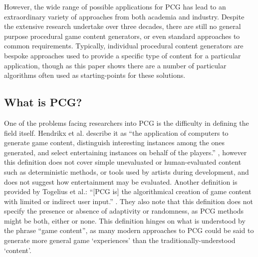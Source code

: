 \documentclass{acm_proc_article-sp}
\begin{document}
However, the wide range of possible applications for PCG has lead to an extraordinary variety of approaches from both academia and industry. Despite the extensive research undertake over three decades, there are still no general purpose procedural game content generators, or even standard approaches to common requirements. Typically, individual procedural content generators are bespoke approaches used to provide a specific type of content for a particular application, though as this paper shows there are a number of particular algorithms often used as starting-points for these solutions.

\subsection{What is PCG?}
One of the problems facing researchers into PCG is the difficulty in defining the field itself.
Hendrikx et al. describe it as ``the application of computers to generate game content, distinguish interesting instances among the ones generated, and select entertaining instances on behalf of the players.'' \cite{hendrikx2012procedural}, however this definition does not cover simple unevaluated or human-evaluated content such as deterministic methods, or tools used by artists during development, and does not suggest how entertainment may be evaluated. Another definition is provided by Togelius et al.: ``[PCG is] the algorithmical creation of game content with limited or indirect user input.'' \cite{togeliusPCGdef}. They also note that this definition does not specify the presence or absence of adaptivity or randomness, as PCG methods might be both, either or none. This definition hinges on what is understood by the phrase ``game content'', as many modern approaches to PCG could be said to generate more general game `experiences' than the traditionally-understood `content'.
\end{document}
